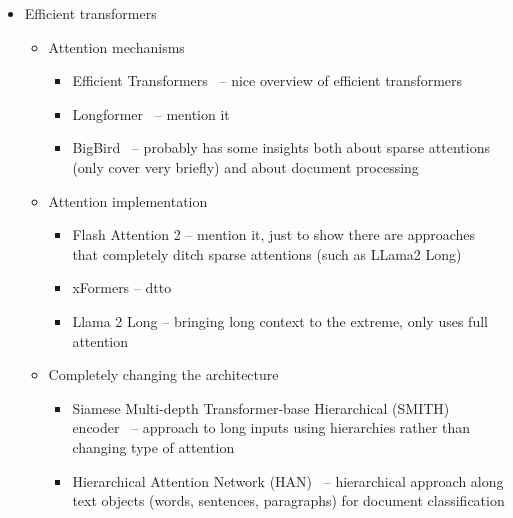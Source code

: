 \begin{itemize}
  \item Efficient transformers

    \begin{itemize}

      \item Attention mechanisms

        \begin{itemize}
          \item Efficient Transformers~\cite{tay2022efficient} -- nice overview of
            efficient transformers

          \item Longformer~\cite{beltagy2020longformer} -- mention it

          \item BigBird~\cite{zaheer2020big} -- probably has some insights both about
            sparse attentions (only cover very briefly) and about document processing

        \end{itemize}

      \item Attention implementation

        \begin{itemize}

          \item Flash Attention 2 -- mention it, just to show there are approaches that
            completely ditch sparse attentions (such as LLama2 Long)
          \item xFormers -- dtto

          \item Llama 2 Long -- bringing long context to the extreme, only uses full attention

        \end{itemize}

      \item Completely changing the architecture

        \begin{itemize}

          \item Siamese Multi-depth Transformer-base Hierarchical (SMITH)
            encoder~\cite{yang2020beyond} -- approach to long inputs using hierarchies
            rather than changing type of attention

          \item Hierarchical Attention Network (HAN)~\cite{yang2016hierarchical} --
            hierarchical approach along text objects (words, sentences, paragraphs) for
            document classification


\end{itemize}
\end{itemize}
\end{itemize}
